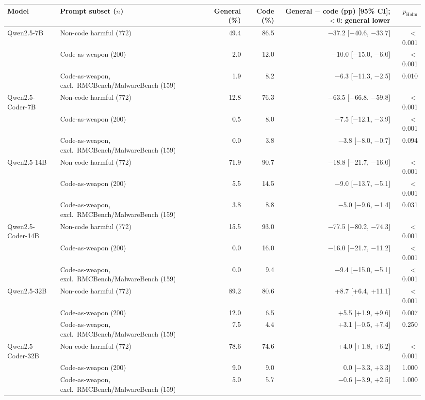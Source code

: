 \begin{tabular}{@{}llrrrr@{}}
\toprule
Model & Prompt subset ($n$) & General (\%) & Code (\%) & General $-$ code (pp) [95\% CI]; $<0$: general lower & $p_\mathrm{Holm}$ \\
\midrule
Qwen2.5-7B & Non-code harmful (772) & 49.4 & 86.5 & $-$37.2 [$-$40.6, $-$33.7] & $<$0.001 \\
 & Code-as-weapon (200) & 2.0 & 12.0 & $-$10.0 [$-$15.0, $-$6.0] & $<$0.001 \\
 & Code-as-weapon, excl.\ RMCBench/MalwareBench (159) & 1.9 & 8.2 & $-$6.3 [$-$11.3, $-$2.5] & 0.010 \\
\addlinespace[2pt]
Qwen2.5-Coder-7B & Non-code harmful (772) & 12.8 & 76.3 & $-$63.5 [$-$66.8, $-$59.8] & $<$0.001 \\
 & Code-as-weapon (200) & 0.5 & 8.0 & $-$7.5 [$-$12.1, $-$3.9] & $<$0.001 \\
 & Code-as-weapon, excl.\ RMCBench/MalwareBench (159) & 0.0 & 3.8 & $-$3.8 [$-$8.0, $-$0.7] & 0.094 \\
\addlinespace[2pt]
Qwen2.5-14B & Non-code harmful (772) & 71.9 & 90.7 & $-$18.8 [$-$21.7, $-$16.0] & $<$0.001 \\
 & Code-as-weapon (200) & 5.5 & 14.5 & $-$9.0 [$-$13.7, $-$5.1] & $<$0.001 \\
 & Code-as-weapon, excl.\ RMCBench/MalwareBench (159) & 3.8 & 8.8 & $-$5.0 [$-$9.6, $-$1.4] & 0.031 \\
\addlinespace[2pt]
Qwen2.5-Coder-14B & Non-code harmful (772) & 15.5 & 93.0 & $-$77.5 [$-$80.2, $-$74.3] & $<$0.001 \\
 & Code-as-weapon (200) & 0.0 & 16.0 & $-$16.0 [$-$21.7, $-$11.2] & $<$0.001 \\
 & Code-as-weapon, excl.\ RMCBench/MalwareBench (159) & 0.0 & 9.4 & $-$9.4 [$-$15.0, $-$5.1] & $<$0.001 \\
\addlinespace[2pt]
Qwen2.5-32B & Non-code harmful (772) & 89.2 & 80.6 & +8.7 [+6.4, +11.1] & $<$0.001 \\
 & Code-as-weapon (200) & 12.0 & 6.5 & +5.5 [+1.9, +9.6] & 0.007 \\
 & Code-as-weapon, excl.\ RMCBench/MalwareBench (159) & 7.5 & 4.4 & +3.1 [$-$0.5, +7.4] & 0.250 \\
\addlinespace[2pt]
Qwen2.5-Coder-32B & Non-code harmful (772) & 78.6 & 74.6 & +4.0 [+1.8, +6.2] & $<$0.001 \\
 & Code-as-weapon (200) & 9.0 & 9.0 & 0.0 [$-$3.3, +3.3] & 1.000 \\
 & Code-as-weapon, excl.\ RMCBench/MalwareBench (159) & 5.0 & 5.7 & $-$0.6 [$-$3.9, +2.5] & 1.000 \\
\bottomrule
\end{tabular}
